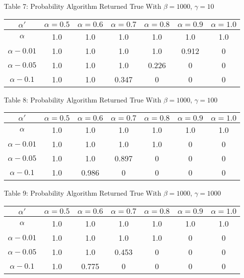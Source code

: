 \documentclass{article}
\begin{document}
\begin{center}
Table 7: Probability Algorithm Returned True With $\beta=1000$, $\gamma=10$ \\
\begin{tabular}{|c|c|c|c|c|c|c|}
\hline
$\alpha'$ & $\alpha = 0.5$ & $\alpha = 0.6$ & $\alpha = 0.7$ & $\alpha = 0.8$ & $\alpha = 0.9$ & $\alpha = 1.0$ \\
\hline
$\alpha$ & 1.0 & 1.0 & 1.0 & 1.0 & 1.0 & 1.0 \\
\hline
$\alpha-0.01$ & 1.0 & 1.0 & 1.0 & 1.0 & 0.912 & 0 \\
\hline
$\alpha-0.05$ & 1.0 & 1.0 & 1.0 & 0.226 & 0 & 0 \\
\hline
$\alpha-0.1$ & 1.0 & 1.0 & 0.347 & 0 & 0 & 0 \\
\hline
\end{tabular}
\end{center}

\begin{center}
Table 8: Probability Algorithm Returned True With $\beta=1000$, $\gamma=100$ \\
\begin{tabular}{|c|c|c|c|c|c|c|}
\hline
$\alpha'$ & $\alpha = 0.5$ & $\alpha = 0.6$ & $\alpha = 0.7$ & $\alpha = 0.8$ & $\alpha = 0.9$ & $\alpha = 1.0$ \\
\hline
$\alpha$ & 1.0 & 1.0 & 1.0 & 1.0 & 1.0 & 1.0 \\
\hline
$\alpha-0.01$ & 1.0 & 1.0 & 1.0 & 1.0 & 0 & 0 \\
\hline
$\alpha-0.05$ & 1.0 & 1.0 & 0.897 & 0 & 0 & 0 \\
\hline
$\alpha-0.1$ & 1.0 & 0.986 & 0 & 0 & 0 & 0 \\
\hline
\end{tabular}
\end{center}

\begin{center}
Table 9: Probability Algorithm Returned True With $\beta=1000$, $\gamma=1000$ \\
\begin{tabular}{|c|c|c|c|c|c|c|}
\hline
$\alpha'$ & $\alpha = 0.5$ & $\alpha = 0.6$ & $\alpha = 0.7$ & $\alpha = 0.8$ & $\alpha = 0.9$ & $\alpha = 1.0$ \\
\hline
$\alpha$ & 1.0 & 1.0 & 1.0 & 1.0 & 1.0 & 1.0 \\
\hline
$\alpha-0.01$ & 1.0 & 1.0 & 1.0 & 1.0 & 0 & 0 \\
\hline
$\alpha-0.05$ & 1.0 & 1.0 & 0.453 & 0 & 0 & 0 \\
\hline
$\alpha-0.1$ & 1.0 & 0.775 & 0 & 0 & 0 & 0 \\
\hline
\end{tabular}
\end{center}
\end{document}
